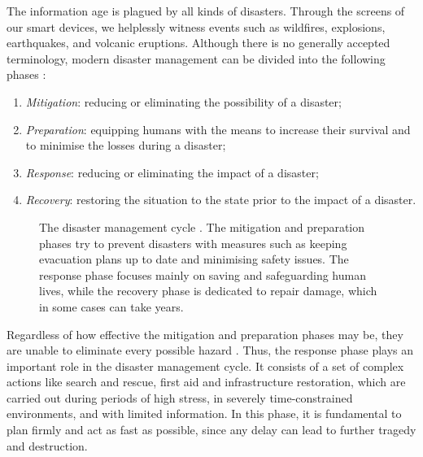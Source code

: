 The information age is plagued by all kinds of disasters. Through the screens of our
smart devices, we helplessly witness events such as wildfires, explosions, earthquakes,
and volcanic eruptions. Although there is no generally accepted terminology, modern
disaster management can be divided into the following phases
\cite{alexander2002,hawe2012survey}:
\begin{enumerate}
    \item \emph{Mitigation}: reducing or eliminating the possibility of a disaster;
    \item \emph{Preparation}: equipping humans with the means to increase their survival
        and to minimise the losses during a disaster;
    \item \emph{Response}: reducing or eliminating the impact of a disaster;
    \item \emph{Recovery}: restoring the situation to the state prior to the impact of a
        disaster.
\end{enumerate}
\begin{figure}[t]
    \centering
    \begin{adjustbox}{width=.4\textwidth}
        
    \end{adjustbox}
    \caption[The disaster management cycle]{The disaster management cycle
        \cite{alexander2002}. The mitigation and preparation phases try to prevent
        disasters with measures such as keeping evacuation plans up to date and minimising
        safety issues. The response phase focuses mainly on saving and safeguarding human
        lives, while the recovery phase is dedicated to repair damage, which in some cases
        can take years.}
    \label{fig:dr}
\end{figure}
Regardless of how effective the mitigation and preparation phases may be, they are unable
to eliminate every possible hazard \cite{coppola2006}. Thus, the response phase plays an
important role in the disaster management cycle. It consists of a set of complex actions
like search and rescue, first aid and infrastructure restoration, which are carried out
during periods of high stress, in severely time-constrained environments, and with limited
information. In this phase, it is fundamental to plan firmly and act as fast as possible,
since any delay can lead to further tragedy and destruction.

